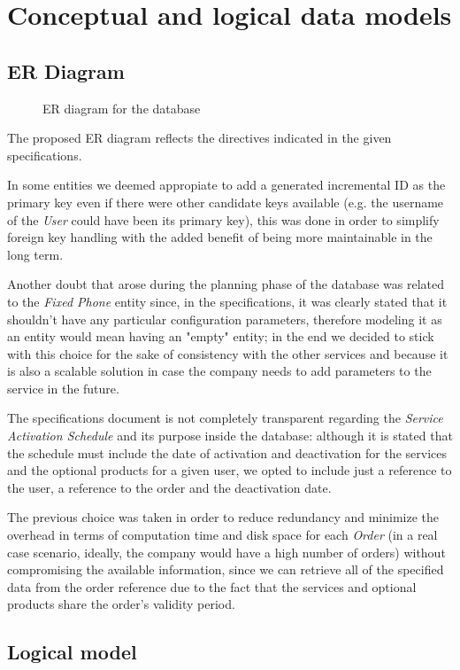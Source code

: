 
\chapter{Conceptual and logical data models}
\label{chap:data_models}


\section{ER Diagram}
\label{sec:er_diagram}

\begin{figure}[h]
    \centering
    \centerline{}
    \caption{ER diagram for the database}
    \label{fig:er_diagram}
\end{figure}

The proposed ER diagram reflects the directives indicated in the given specifications.

In some entities we deemed appropiate to add a generated incremental ID as the primary key even if there were other candidate keys available (e.g. the username of the \textit{User} could have been its primary key), this was done in order to simplify foreign key handling with the added benefit of being more maintainable in the long term.

Another doubt that arose during the planning phase of the database was related to the \textit{Fixed Phone} entity since, in the specifications, it was clearly stated that it shouldn't have any particular configuration parameters, therefore modeling it as an entity would mean having an "empty" entity; in the end we decided to stick with this choice for the sake of consistency with the other services and because it is also a scalable solution in case the company needs to add parameters to the service in the future.

The specifications document is not completely transparent regarding the \textit{Service Activation Schedule} and its purpose inside the database: although it is stated that the schedule must include the date of activation and deactivation for the services and the optional products for a given user, we opted to include just a reference to the user, a reference to the order and the deactivation date.

The previous choice was taken in order to reduce redundancy and minimize the overhead in terms of computation time and disk space for each \textit{Order} (in a real case scenario, ideally, the company would have a high number of orders) without compromising the available information, since we can retrieve all of the specified data from the order reference due to the fact that the services and optional products share the order's validity period.


\section{Logical model}
\label{sec:logical_model}


\blindtext

